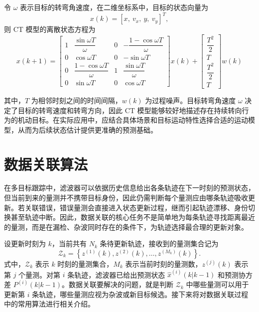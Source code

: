 \documentclass{xdupgthesis}
\begin{document}
令 $\omega$ 表示目标的转弯角速度，在二维坐标系中，目标的状态向量为
\[
x(k)=[x,\ v_x,\ y,\ v_y]^T,
\]
则 CT 模型的离散状态方程为
\begin{equation}
	x(k+1)=
	\begin{bmatrix}
		1 & \dfrac{\sin \omega T}{\omega} & 0 & -\dfrac{1-\cos \omega T}{\omega}\\[8pt]
		0 & \cos \omega T & 0 & -\sin \omega T\\[6pt]
		0 & \dfrac{1-\cos \omega T}{\omega} & 1 & \dfrac{\sin \omega T}{\omega}\\[8pt]
		0 & \sin \omega T & 0 & \cos \omega T
	\end{bmatrix}
	x(k)
	+
	\begin{bmatrix}
		\dfrac{T^2}{2}\\
		T\\
		\dfrac{T^2}{2}\\
		T
	\end{bmatrix}
	w(k)
\end{equation}

其中，$T$ 为相邻时刻之间的时间间隔，$w(k)$ 为过程噪声。目标转弯角速度 $\omega$ 决定了目标的转弯速度和转弯方向，因此 CT 模型能够较好地描述存在持续转向行为的机动目标。在实际应用中，应结合具体场景和目标运动特性选择合适的运动模型，从而为后续状态估计提供更准确的预测基础。



\section{数据关联算法}\label{sec:orm}

在多目标跟踪中，滤波器可以依据历史信息给出各条轨迹在下一时刻的预测状态，但当前到来的量测并不携带目标身份，因此仍需判断每个量测应由哪条轨迹吸收更新。若关联错误，错误量测会直接进入状态更新过程，继而引起轨迹漂移、身份切换甚至轨迹中断。因此，数据关联的核心任务不是简单地为每条轨迹寻找距离最近的量测，而是在漏检、杂波同时存在的条件下，为轨迹选择最合理的更新对象。

设更新时刻为 $k$，当前共有 $N_k$ 条待更新轨迹，接收到的量测集合记为
\begin{equation}
	\mathcal{Z}_k=
	\left\{
	z^{(1)}(k),z^{(2)}(k),\ldots,z^{(M_k)}(k)
	\right\}.
\end{equation}
式中，$\mathcal{Z}_k$ 表示 $k$ 时刻的量测集合，$M_k$ 表示当前时刻的量测数，$z^{(j)}(k)$ 表示第 $j$ 个量测。对第 $i$ 条轨迹，滤波器已给出预测状态 $\hat{x}^{(i)}(k|k-1)$ 和预测协方差 $P^{(i)}(k|k-1)$。数据关联要解决的问题，就是判断 $\mathcal{Z}_k$ 中哪些量测可以用于更新第 $i$ 条轨迹，哪些量测应视为杂波或新目标候选。接下来将对数据关联过程中的常用算法进行相关介绍。
\end{document}
